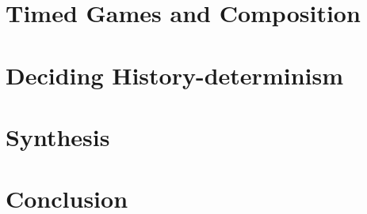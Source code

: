 \documentclass{lmcs} %
\begin{document}
	\section{Timed Games and Composition}
	\label{sec_games}
	\label{sec:games}
	
	
	\section{Deciding History-determinism}
	\label{sec_decision}
	\label{sec:decision}
	
	
	
	\section{Synthesis}
	\label{sec_synthesis}
	\label{sec:synthesis}
	
	
	
	\section{Conclusion}
	\label{sec_conclusion}
	
	
	
	
	
	
	
	
	
	
	
\end{document}
